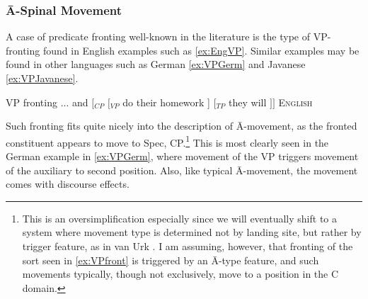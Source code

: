 \documentclass[output=paper,colorlinks,citecolor=brown,
]{langscibook}
\begin{document}
\subsubsection{\=A-Spinal Movement}



A case of predicate fronting well-known in the literature is the type of VP-fronting found in English examples such as \ref{ex:EngVP}.  Similar examples may be found in other languages such as German \ref{ex:VPGerm} and Javanese \ref{ex:VPJavanese}.

\ea VP fronting \label{ex:VPfront}
\ea  ... and $[$$_{CP}$ $[$$_{VP}$ do their homework ] $[$$_{TP}$ they will \underline{\hspace{.5cm}} $]]$ \hfill \textsc{English}\label{ex:EngVP}\\

Such fronting fits quite nicely into the description of \=A-movement, as the fronted constituent appears to move to Spec, CP.\footnote{This is an oversimplification especially since we will eventually shift to a system where movement type is determined not by landing site, but rather by trigger feature, as in van Urk \citeyearpar{vanUrk:2015a}. I am assuming, however, that fronting of the sort seen in \ref{ex:VPfront} is triggered by an \=A-type feature, and such movements typically, though not exclusively, move to a position in the C domain.}  This is most clearly seen in the German example in  \ref{ex:VPGerm}, where movement of the VP triggers movement of the auxiliary to second position.  Also, like typical \=A-movement, the movement comes with discourse effects.
\end{document}

